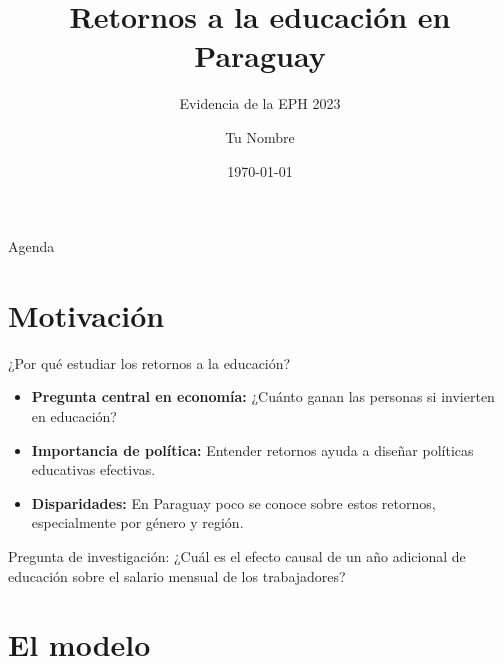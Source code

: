 \documentclass[aspectratio=169]{beamer}
\title{Retornos a la educación en Paraguay}
\subtitle{Evidencia de la EPH 2023}
\author{Tu Nombre}
\institute{Tu Institución}
\date{\today}
\begin{document}
\maketitle

\begin{frame}{Agenda}
  \tableofcontents
\end{frame}

\section{Motivación}

\begin{frame}{¿Por qué estudiar los retornos a la educación?}
  \begin{itemize}
    \item \textbf{Pregunta central en economía:} ¿Cuánto ganan las personas 
          si invierten en educación?
    \item \textbf{Importancia de política:} Entender retornos ayuda a diseñar 
          políticas educativas efectivas.
    \item \textbf{Disparidades:} En Paraguay poco se conoce sobre estos retornos, 
          especialmente por género y región.
  \end{itemize}

  \vspace{1em}
  \alert{Pregunta de investigación:} ¿Cuál es el efecto causal de un año 
  adicional de educación sobre el salario mensual de los trabajadores?
\end{frame}

\section{El modelo}
\end{document}
